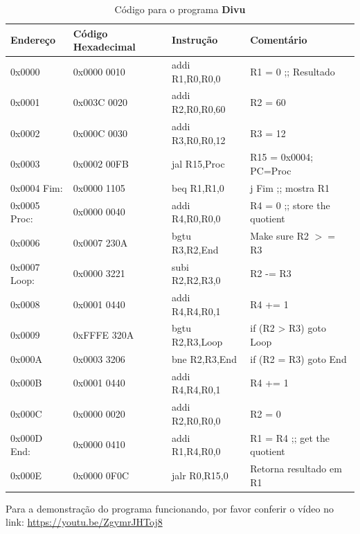 \documentclass[12pt]{article}
\begin{document}
\begin{table}[H]
    \centering
    \caption{Código para o programa \textbf{Divu}}
    \begin{tabular}{|l|l|l|l|}\hline
        \textbf{Endereço} & \textbf{Código Hexadecimal} & \textbf{Instrução} & \textbf{Comentário} \\\hline
        0x0000       & 0x0000 0010 & addi R1,R0,R0,0  & R1 = 0 ;; Resultado           \\\hline
        0x0001       & 0x003C 0020 & addi R2,R0,R0,60 & R2 = 60                       \\\hline
        0x0002       & 0x000C 0030 & addi R3,R0,R0,12 & R3 = 12                       \\\hline
        0x0003       & 0x0002 00FB & jal R15,Proc     & R15 = 0x0004; PC=Proc         \\\hline
        0x0004 Fim:  & 0x0000 1105 & beq R1,R1,0      & j Fim ;; mostra R1            \\\hline
        0x0005 Proc: & 0x0000 0040 & addi R4,R0,R0,0  & R4 = 0 ;; store the quotient  \\\hline
        0x0006       & 0x0007 230A & bgtu R3,R2,End   & Make sure R2 $>=$ R3           \\\hline
        0x0007 Loop: & 0x0000 3221 & subi R2,R2,R3,0  & R2 -= R3                      \\\hline
        0x0008       & 0x0001 0440 & addi R4,R4,R0,1  & R4 += 1                       \\\hline
        0x0009       & 0xFFFE 320A & bgtu R2,R3,Loop  & if (R2 > R3) goto Loop        \\\hline
        0x000A       & 0x0003 3206 & bne  R2,R3,End   & if (R2 \!= R3) goto End       \\\hline
        0x000B       & 0x0001 0440 & addi R4,R4,R0,1  & R4 += 1                       \\\hline
        0x000C       & 0x0000 0020 & addi R2,R0,R0,0  & R2 = 0                        \\\hline
        0x000D End:  & 0x0000 0410 & addi R1,R4,R0,0  & R1 = R4 ;; get the quotient   \\\hline
        0x000E       & 0x0000 0F0C & jalr R0,R15,0    & Retorna resultado em R1       \\\hline
    \end{tabular}\label{tab:programs:divu}
\end{table}

Para a demonstração do programa funcionando, por favor conferir o vídeo no link:
\href{https://youtu.be/ZgymrJHToj8}{https://youtu.be/ZgymrJHToj8}
\end{document}
